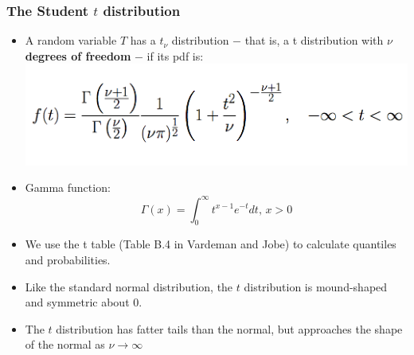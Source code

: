 \documentclass[handout]{beamer}\usepackage[]{graphicx}\usepackage[]{color}
\providecommand{\rt}{\rightarrow}
\numberwithin{equation}{section}
\begin{document}
\begin{frame}
\frametitle{The Student $t$ distribution}
\begin{itemize}
\item A random variable $T$ has a $t_\nu$ distribution $-$ that is, a t distribution with $\nu$ {\bf degrees of freedom } $-$ if its pdf is:
 \includegraphics{../../fig/tpdf.png}
\item Gamma function:
\[\Gamma(x) = \int_0^\infty t^{x-1} e^{-t} dt,\, x > 0\]
\pause \item We use the t table (Table B.4 in Vardeman and Jobe) to calculate quantiles and probabilities.
\pause \item Like the standard normal distribution, the $t$ distribution is mound-shaped and symmetric about 0.
\pause \item The $t$ distribution has fatter tails than the normal, but approaches the shape of the normal as $\nu \rt \infty$
\end{itemize}
\end{frame}
\end{document}

